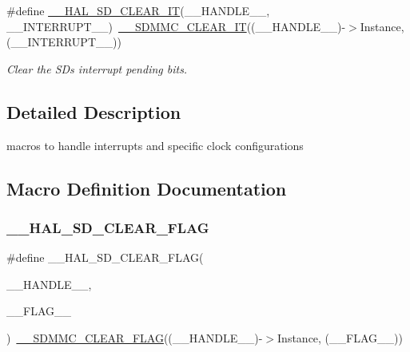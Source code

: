 \begin{DoxyCompactItemize}
\#define \mbox{\hyperlink{group___s_d___exported__macros_ga80f2ae25047298cbcec8226bd23dc02e}{\+\_\+\+\_\+\+H\+A\+L\+\_\+\+S\+D\+\_\+\+C\+L\+E\+A\+R\+\_\+\+IT}}(\+\_\+\+\_\+\+H\+A\+N\+D\+L\+E\+\_\+\+\_\+,  \+\_\+\+\_\+\+I\+N\+T\+E\+R\+R\+U\+P\+T\+\_\+\+\_\+)~\mbox{\hyperlink{group___s_d_m_m_c___l_l___interrupt___clock_ga86db406c85993ed8b12903ca403538f0}{\+\_\+\+\_\+\+S\+D\+M\+M\+C\+\_\+\+C\+L\+E\+A\+R\+\_\+\+IT}}((\+\_\+\+\_\+\+H\+A\+N\+D\+L\+E\+\_\+\+\_\+)-\/$>$Instance, (\+\_\+\+\_\+\+I\+N\+T\+E\+R\+R\+U\+P\+T\+\_\+\+\_\+))
\begin{DoxyCompactList}\small\item\em Clear the SD\textquotesingle{}s interrupt pending bits. \end{DoxyCompactList}\end{DoxyCompactItemize}


\subsection{Detailed Description}
macros to handle interrupts and specific clock configurations 



\subsection{Macro Definition Documentation}
\mbox{\label{group___s_d___exported__macros_ga549917d470084bc874ab229d2053727b}} 
\subsubsection{\texorpdfstring{\_\_HAL\_SD\_CLEAR\_FLAG}{\_\_HAL\_SD\_CLEAR\_FLAG}}
{\footnotesize\ttfamily \#define \+\_\+\+\_\+\+H\+A\+L\+\_\+\+S\+D\+\_\+\+C\+L\+E\+A\+R\+\_\+\+F\+L\+AG(\begin{DoxyParamCaption}\item[{}]{\+\_\+\+\_\+\+H\+A\+N\+D\+L\+E\+\_\+\+\_\+,  }\item[{}]{\+\_\+\+\_\+\+F\+L\+A\+G\+\_\+\+\_\+ }\end{DoxyParamCaption})~\mbox{\hyperlink{group___s_d_m_m_c___l_l___interrupt___clock_ga1f35f651980bee563bd9c7d00052cdc8}{\+\_\+\+\_\+\+S\+D\+M\+M\+C\+\_\+\+C\+L\+E\+A\+R\+\_\+\+F\+L\+AG}}((\+\_\+\+\_\+\+H\+A\+N\+D\+L\+E\+\_\+\+\_\+)-\/$>$Instance, (\+\_\+\+\_\+\+F\+L\+A\+G\+\_\+\+\_\+))}



